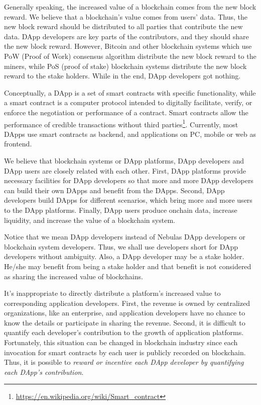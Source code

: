 Generally speaking, the increased value of a blockchain comes from the new block
reward. We believe that a blockchain's value comes from users' data. Thus, the
new block reward should be distributed to all parties that contribute the
new data. DApp developers are key parts of the contributors, and they should
share the new block reward. However, Bitcoin and other blockchain systems
which use PoW (Proof of Work) consensus algorithm distribute the new block reward
to the miners, while PoS (proof of stake) blockchain systems distribute the new
block reward to the stake holders. While in the end, DApp developers got
nothing.

Conceptually, a DApp is a set of smart contracts with specific
functionality, while a smart contract is a computer protocol intended to
digitally facilitate, verify, or enforce the negotiation or performance of a
contract. Smart contracts allow the performance of credible transactions
without third
parties\footnote{\url{https://en.wikipedia.org/wiki/Smart\_contract}}.
Currently, most DApps use smart contracts as backend, and applications on PC,
mobile or web as frontend.

We believe that blockchain systems or DApp platforms, DApp developers and DApp
users are closely related with each other. First, DApp platforms provide
necessary facilities for DApp developers so that more and more DApp developers
can build their own DApps and benefit from the DApps. Second, DApp
developers build DApps for different scenarios, which bring more and more
users to the DApp platforms. Finally, DApp users produce onchain data,
increase liquidity, and increase the value of a blockchain system.

Notice that we mean DApp developers instead of Nebulas DApp developers or
blockchain system developers. Thus, we shall use developers short for DApp
developers without ambiguity. Also, a DApp developer may be a stake holder.
He/she may benefit from being a stake holder and that benefit is not considered
as sharing the increased value of blockchains.


It's inappropriate to directly distribute a platform's increased value to
corresponding application developers. First, the revenue is owned by
centralized organizations, like an enterprise, and application developers have
no chance to know the details or participate in sharing the revenue. Second, it
is difficult to quantify each developer's contribution to the growth of
application platforms. Fortunately, this situation can be changed in blockchain
industry since each invocation for smart contracts by each user is
publicly recorded on
blockchain. Thus, it is possible to \emph{reward or incentive each DApp developer by
quantifying each DApp's contribution}.

